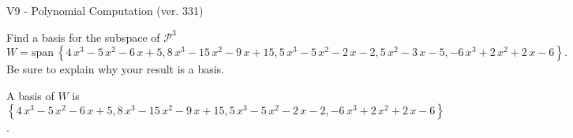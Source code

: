 \begin{exercise}
  \begin{exerciseTitle}V9 - Polynomial Computation (ver. 331)\end{exerciseTitle}
  \begin{exerciseStatement}
    Find a basis for the subspace of \(\mathcal{P}^3\) 
\[W=\mathrm{span}\ \left\{4 \, x^{3} - 5 \, x^{2} - 6 \, x + 5 , 8 \, x^{3} - 15 \, x^{2} - 9 \, x + 15 , 5 \, x^{3} - 5 \, x^{2} - 2 \, x - 2 , 5 \, x^{2} - 3 \, x - 5 , -6 \, x^{3} + 2 \, x^{2} + 2 \, x - 6\right\}.\]
 Be sure to explain why your result is a basis.


  \end{exerciseStatement}
  \begin{exerciseAnswer}
   A basis of \(W\) is  \(\left\{4 \, x^{3} - 5 \, x^{2} - 6 \, x + 5 , 8 \, x^{3} - 15 \, x^{2} - 9 \, x + 15 , 5 \, x^{3} - 5 \, x^{2} - 2 \, x - 2 , -6 \, x^{3} + 2 \, x^{2} + 2 \, x - 6\right\}\).
  


  \end{exerciseAnswer}
\end{exercise}